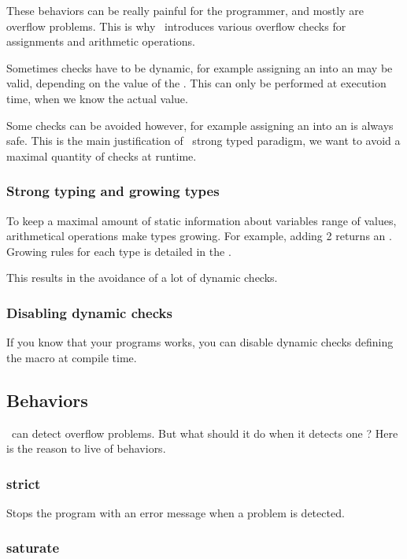 These behaviors can be really painful for the programmer, and mostly
are overflow problems. This is why \integre\ introduces various
overflow checks for assignments and arithmetic operations.

Sometimes checks have to be dynamic, for example assigning an
 into an  may be valid, depending on the
value of the . This can only be performed at execution
time, when we know the actual value.

Some checks can be avoided however, for example assigning an
 into an  is always safe. This is the main
justification of \integre\ strong typed paradigm, we want to avoid a
maximal quantity of checks at runtime.

\subsubsection{Strong typing and growing types}

To keep a maximal amount of static information about variables
range of values, arithmetical operations make types growing. For
example, adding 2  returns an . Growing
rules for each type is detailed in the .

This results in the avoidance of a lot of dynamic checks.

\subsubsection{Disabling dynamic checks}

If you know that your programs works, you can disable dynamic checks
defining the macro  at compile time.

\subsection{Behaviors}

\integre\ can detect overflow problems. But what should it do when it
detects one ? Here is the reason to live of behaviors.

\subsubsection{strict}

Stops the program with an error message when a problem is detected.

\subsubsection{saturate}

